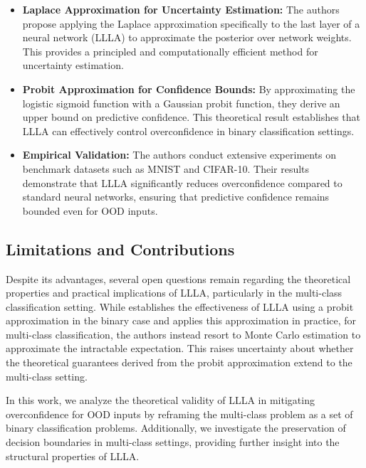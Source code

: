 \documentclass{article}
\begin{document}
\begin{itemize}
    \item \textbf{Laplace Approximation for Uncertainty Estimation:} 
    The authors propose applying the Laplace approximation specifically to the last layer of a neural network (LLLA) to approximate the posterior over network weights. This provides a principled and computationally efficient method for uncertainty estimation.
    
    \item \textbf{Probit Approximation for Confidence Bounds:} 
    By approximating the logistic sigmoid function with a Gaussian probit function, they derive an upper bound on predictive confidence. This theoretical result establishes that LLLA can effectively control overconfidence in binary classification settings.

    \item \textbf{Empirical Validation:} 
    The authors conduct extensive experiments on benchmark datasets such as MNIST and CIFAR-10. Their results demonstrate that LLLA significantly reduces overconfidence compared to standard neural networks, ensuring that predictive confidence remains bounded even for OOD inputs.
\end{itemize}

\subsection{Limitations and Contributions}

Despite its advantages, several open questions remain regarding the theoretical properties and practical implications of LLLA, particularly in the multi-class classification setting. While \cite{main_paper} establishes the effectiveness of LLLA using a probit approximation in the binary case and applies this approximation in practice, for multi-class classification, the authors instead resort to Monte Carlo estimation to approximate the intractable expectation. This raises uncertainty about whether the theoretical guarantees derived from the probit approximation extend to the multi-class setting.

In this work, we analyze the theoretical validity of LLLA in mitigating overconfidence for OOD inputs by reframing the multi-class problem as a set of binary classification problems. Additionally, we investigate the preservation of decision boundaries in multi-class settings, providing further insight into the structural properties of LLLA.
\end{document}

